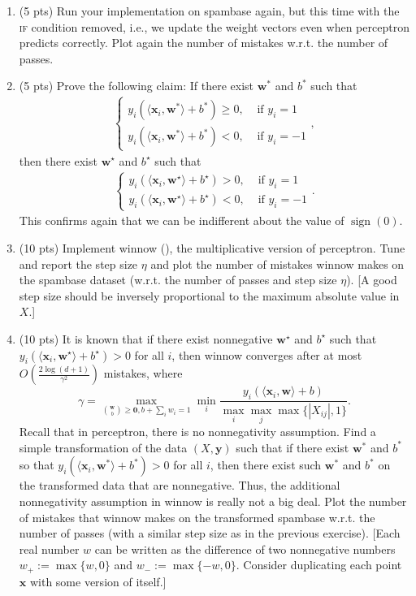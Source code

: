 \documentclass[10pt,letter,notitlepage]{article}
\newcommand{\sign}{\mathop{\mathrm{sign}}}
\newcommand{\zero}{\mathbf{0}}
\newcommand{\wv}{\mathbf{w}}
\newcommand{\xv}{\mathbf{x}}
\newcommand{\yv}{\mathbf{y}}
\newcommand{\inner}[2]{\langle #1, #2 \rangle}
\newcommand{\red}[1]{{\color{red}#1}}
\newcommand{\blue}[1]{{\color{blue}#1}}
\newcommand{\ie}{{i.e.}\xspace}
\newcommand{\wrt}{{w.r.t.}\xspace}
\newcounter{exercise}
\begin{document}
\begin{exercise}
\begin{enumerate}
		\item (5 pts) Run your implementation on \textsf{spambase} again, but this time with the \textsc{if} condition removed, \ie, we update the weight vectors even when perceptron predicts correctly. Plot again the number of mistakes \wrt the number of passes.
		
		\item (5 pts) Prove the following claim: If there exist $\wv^*$ and $b^*$ such that 		\begin{align}
		\begin{cases}
		y_i(\inner{\xv_i}{\wv^*}+b^*) \geq 0, & \text{ if } y_i = 1\\
		y_i(\inner{\xv_i}{\wv^*}+b^*) < 0, & \text{ if } y_i = -1
		\end{cases}
		,
	\end{align}
		then there exist $\wv^\star$ and $b^\star$ such that 
	\begin{align}
		\begin{cases}
		y_i(\inner{\xv_i}{\wv^\star}+b^\star) > 0, & \text{ if } y_i = 1\\
		y_i(\inner{\xv_i}{\wv^\star}+b^\star) < 0, & \text{ if } y_i = -1
		\end{cases}
		.
	\end{align}
	This confirms again that we can be indifferent about the value of $\sign(0)$.
		\item (10 pts) Implement winnow (), the multiplicative version of perceptron. Tune and report the step size $\eta$ and plot the number of mistakes winnow makes on the \textsf{spambase} dataset (\wrt the number of passes and step size $\eta$). [A good step size should be inversely proportional to the maximum absolute value in $X$.]
		\item (10 pts) It is known that if there exist \red{nonnegative} $\wv^\star$ and $b^\star$ such that $y_i (\inner{\xv_i}{\wv^\star}+b^\star) > 0$ for all $i$, then winnow converges after at most $O(\frac{2\log(d+1)}{\gamma^2})$ mistakes, where 
		$$\gamma = \max_{{\wv \choose b} \geq \zero, b+\sum_i w_i=1} \min_i \frac{y_i (\inner{\xv_i}{\wv}+b)}{\max_i\max_j \max\{|X_{ij}|,1\} }.
		$$		
		Recall that in perceptron, there is no nonnegativity assumption. 
		Find a simple transformation of the data $(X, \yv)$ such that if there exist $\wv^*$ and $b^*$ so that $y_i (\inner{\xv_i}{\wv^*}+b^*) > 0$ for all $i$, then there exist such $\wv^*$ and $b^*$ on the \red{transformed} data that are \blue{nonnegative}. Thus, the additional nonnegativity assumption in winnow is really not a big deal. Plot the number of mistakes that winnow makes on the transformed \textsf{spambase} \wrt the number of passes (with a similar step size as in the previous exercise). [Each real number $w$ can be written as the difference of two nonnegative numbers $w_+ := \max\{w, 0\}$ and $w_- := \max\{-w, 0\}$. Consider duplicating each point $\xv$ with some version of itself.]
		

\end{enumerate}
\end{exercise}
\end{document}
